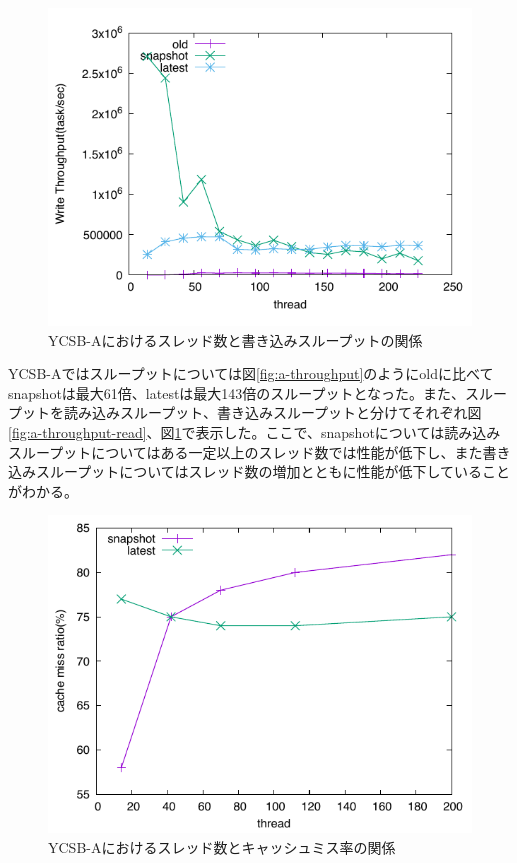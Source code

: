 \documentclass[a4paper]{jreport}	%
\begin{document}
\begin{figure}[h] 
\centering
\includegraphics[width=15cm]{ycsb-a/opposite-write-throughput}
\caption{YCSB-Aにおけるスレッド数と書き込みスループットの関係}
\label{fig:a-throughput-write}
\end{figure}


YCSB-Aではスループットについては図\ref{fig:a-throughput}のようにoldに比べてsnapshotは最大61倍、latestは最大143倍のスループットとなった。また、スループットを読み込みスループット、書き込みスループットと分けてそれぞれ図\ref{fig:a-throughput-read}、図\ref{fig:a-throughput-write}で表示した。ここで、snapshotについては読み込みスループットについてはある一定以上のスレッド数では性能が低下し、また書き込みスループットについてはスレッド数の増加とともに性能が低下していることがわかる。

\begin{figure}[h] 
\centering
\includegraphics[width=15cm]{cache-a}
\caption{YCSB-Aにおけるスレッド数とキャッシュミス率の関係}
\label{fig:a-cache}
\end{figure}
\end{document}
